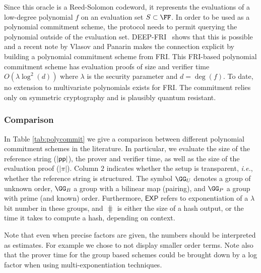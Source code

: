 Since this oracle is a Reed-Solomon codeword, it represents the evaluations of a low-degree polynomial $f$ on an evaluation set $S \subset \FF$. In order to be used as a polynomial commitment scheme, the protocol needs to permit querying the polynomial outside of the evaluation set. DEEP-FRI~\cite{DEEPFRI} shows that this is possible and a recent note by Vlasov and Panarin \cite{MatterLabs} makes the connection explicit by building a polynomial commitment scheme from FRI. 
This FRI-based polynomial commitment scheme has evaluation proofs of size and verifier time $O(\lambda \log^2(d))$ where $\lambda$ is the security parameter and $d = \deg(f)$. To date, no extension to multivariate polynomials exists for FRI. The commitment relies only on symmetric cryptography and is plausibly quantum resistant.

\subsubsection{Comparison}

In Table \ref{tab:polycommit} we give a comparison between different polynomial commitment schemes in the literature. In particular, we evaluate the size of the reference string ($|\textsf{pp}|$), the prover and verifier time, as well as the size of the evaluation proof ($|\pi|$). Column $2$ indicates whether the setup is transparent, \emph{i.e.}, whether the reference string is structured. The symbol $\GG_U$ denotes a group of unknown order, $\GG_{B}$ a group with a bilinear map (pairing), and $\GG_{P}$ a group with prime (and known) order. Furthermore, $\textsf{EXP}$ refers to exponentiation of a $\lambda$ bit number in these groups, and $\hash$ is either the size of a hash output, or the time it takes to compute a hash, depending on context. 

Note that even when precise factors are given, the numbers should be interpreted as estimates. For example we chose to not display smaller order terms.
Note also that the prover time for the group based schemes could be brought down by a log factor when using multi-exponentiation techniques.

